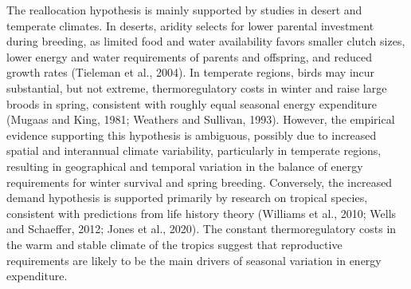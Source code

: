 \documentclass[10pt, twoside]{book} %
\begin{document}
The reallocation hypothesis is mainly supported by studies in desert and temperate climates. In deserts, aridity selects for lower parental investment during breeding, as limited food and water availability favors smaller clutch sizes, lower energy and water requirements of parents and offspring, and reduced growth rates (Tieleman et al., 2004). In temperate regions, birds may incur substantial, but not extreme, thermoregulatory costs in winter and raise large broods in spring, consistent with roughly equal seasonal energy expenditure (Mugaas and King, 1981; Weathers and Sullivan, 1993). However, the empirical evidence supporting this hypothesis is ambiguous, possibly due to increased spatial and interannual climate variability, particularly in temperate regions, resulting in geographical and temporal variation in the balance of energy requirements for winter survival and spring breeding. Conversely, the increased demand hypothesis is supported primarily by research on tropical species, consistent with predictions from life history theory (Williams et al., 2010; Wells and Schaeffer, 2012; Jones et al., 2020). The constant thermoregulatory costs in the warm and stable climate of the tropics suggest that reproductive requirements are likely to be the main drivers of seasonal variation in energy expenditure. \\
\end{document}
